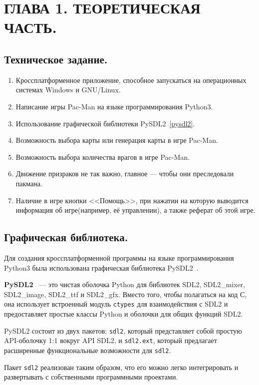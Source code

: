 \chapter{\label{ch:ch01}ГЛАВА 1. ТЕОРЕТИЧЕСКАЯ ЧАСТЬ.}

\section{\label{sec:ch01/sec01}Техническое задание.}
\begin{enumerate}
	\item Кроссплатформенное приложение, способное запускаться на операционных системах Windows и GNU/Linux.
	\item Написание игры Pac-Man на языке программирования Python3.
	\item Использование графической библиотеки PySDL2~\ref{pysdl2}.
	\item Возможность выбора карты или генерация карты в игре Pac-Man.
	\item Возможность выбора количества врагов в игре Pac-Man.
	\item Движение призраков не так важно, главное --- чтобы они преследовали пакмана.
	\item Наличие в игре кнопки <<Помощь>>, при нажатии на которую выводится информация об игре(например, её управлении), а также реферат об этой игре.
\end{enumerate}

\section{\label{sec:ch01/sec02}Графическая библиотека.}
Для создания кроссплатформенной программы на языке программирования Python3 была использована графическая библиотека PySDL2~\cite{pypiRUENpysdl2,docENpysdl2}.

\textbf{PySDL2}~\label{pysdl2} --- это чистая оболочка Python для библиотек SDL2, SDL2\_mixer, SDL2\_image, SDL2\_ttf и SDL2\_gfx. Вместо того, чтобы полагаться на код С, она использует
встроенный модуль \texttt{ctypes} для взаимодействия с SDL2 и предоставляет простые классы Python и оболочки для общих функций SDL2.

PySDL2 состоит из двух пакетов: \texttt{sdl2}, который представляет собой простую API-оболочку 1:1 вокруг API SDL2, и \texttt{sdl2.ext}, который предлагает расширенные функциональные возможности для \texttt{sdl2}.

Пакет \texttt{sdl2} реализован таким образом, что его можно легко интегрировать и развертывать с собственными программными проектами.

